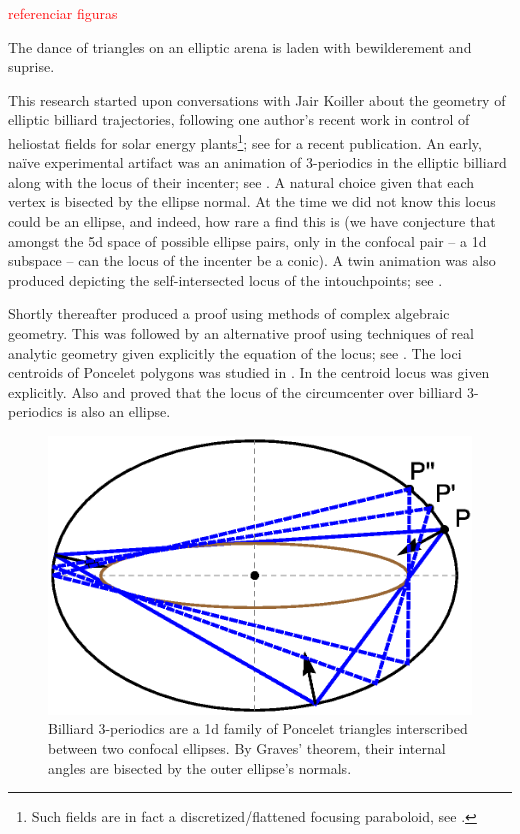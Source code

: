 \textcolor{red}{referenciar figuras}

The dance of triangles on an elliptic arena is laden with bewilderement and suprise. 

This research started upon conversations with Jair Koiller about the geometry of elliptic billiard trajectories, following one author's recent work in control of heliostat fields for solar energy plants\footnote{Such fields are in fact a discretized/flattened focusing paraboloid, see \cite{sundrop2016,esolar2017}.}; see \cite{gross2020-solar} for a recent publication. An early, naïve experimental artifact was an animation of 3-periodics in the elliptic billiard along with the locus of their incenter; see  \cite{dsr_vid11incenter}. A natural choice given that each vertex is bisected by the ellipse normal. At the time we did not know this locus could be an ellipse, and indeed, how rare a find this is (we have conjecture that amongst the 5d space of possible ellipse pairs, only in the confocal pair -- a 1d subspace -- can the locus of the incenter be a conic). A twin animation was also produced depicting the self-intersected locus of the intouchpoints; see \cite{dsr_vid11e}.

Shortly thereafter \cite{olga14} produced a proof using methods of complex algebraic geometry.
This was followed by an alternative    proof using techniques of real analytic   geometry given explicitly the equation of the locus; see \cite{garcia2019-incenter}. The loci centroids of Poncelet polygons was studied in \cite{schwartz2016-com}. In  \cite{garcia2019-incenter} the centroid locus was given explicitly.  Also \cite{corentin2021-circum} and \cite{garcia2018} proved that the locus of the circumcenter over billiard 3-periodics is also an ellipse.

\begin{figure}
    \centering
    \includegraphics[width=.7\textwidth]{chap_01/pics/pics_01_030_three_orbits.eps}
    \caption{Billiard 3-periodics are a 1d family of Poncelet triangles interscribed between two confocal ellipses. By Graves' theorem, their internal angles are bisected by the outer ellipse's normals.}
    \label{fig:01-three-orbits-proof}
\end{figure}

